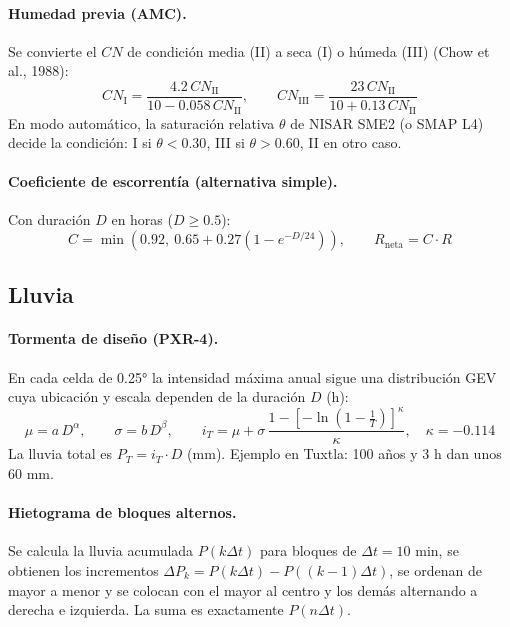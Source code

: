 \documentclass[11pt,letterpaper]{article}
\begin{document}
\paragraph{Humedad previa (AMC).} Se convierte el $CN$ de condición media (II) a seca (I) o húmeda (III) (Chow et al., 1988):
\begin{equation}
CN_{\text{I}}=\frac{4.2\,CN_{\text{II}}}{10-0.058\,CN_{\text{II}}},\qquad CN_{\text{III}}=\frac{23\,CN_{\text{II}}}{10+0.13\,CN_{\text{II}}}
\end{equation}
En modo automático, la saturación relativa $\theta$ de NISAR SME2 (o SMAP L4) decide la condición: I si $\theta<0.30$, III si $\theta>0.60$, II en otro caso.

\paragraph{Coeficiente de escorrentía (alternativa simple).} Con duración $D$ en horas ($D\ge0.5$):
\begin{equation}
C=\min\!\left(0.92,\ 0.65+0.27\left(1-e^{-D/24}\right)\right),\qquad R_{\text{neta}}=C\cdot R
\end{equation}

\subsection{Lluvia}
\paragraph{Tormenta de diseño (PXR-4).} En cada celda de 0.25° la intensidad máxima anual sigue una distribución GEV cuya ubicación y escala dependen de la duración $D$ (h):
\begin{equation}
\mu=a\,D^{\alpha},\qquad \sigma=b\,D^{\beta},\qquad
i_T=\mu+\sigma\,\frac{1-\left[-\ln\!\left(1-\tfrac{1}{T}\right)\right]^{\kappa}}{\kappa},\quad \kappa=-0.114
\end{equation}
La lluvia total es $P_T=i_T\cdot D$ (mm). Ejemplo en Tuxtla: 100 años y 3 h dan unos 60 mm.

\paragraph{Hietograma de bloques alternos.} Se calcula la lluvia acumulada $P(k\Delta t)$ para bloques de $\Delta t=10$ min, se obtienen los incrementos $\Delta P_k=P(k\Delta t)-P((k-1)\Delta t)$, se ordenan de mayor a menor y se colocan con el mayor al centro y los demás alternando a derecha e izquierda. La suma es exactamente $P(n\Delta t)$.
\end{document}

